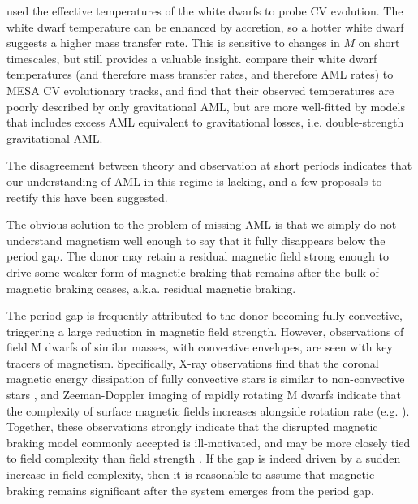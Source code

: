 \citet{Pala2017a} used the effective temperatures of the white dwarfs to probe CV evolution. The white dwarf temperature can be enhanced by accretion, so a hotter white dwarf suggests a higher mass transfer rate. This is sensitive to changes in $\dot M$ on short timescales, but still provides a valuable insight. \citet{Pala2017a} compare their white dwarf temperatures (and therefore mass transfer rates, and therefore AML rates) to MESA CV evolutionary tracks, and find that their observed temperatures are poorly described by only gravitational AML, but are more well-fitted by models that includes excess AML equivalent to gravitational losses, i.e. double-strength gravitational AML. 

The disagreement between theory and observation at short periods indicates that our understanding of AML in this regime is lacking, and a few proposals to rectify this have been suggested.

The obvious solution to the problem of missing AML is that we simply do not understand magnetism well enough to say that it fully disappears below the period gap. The donor may retain a residual magnetic field strong enough to drive some weaker form of magnetic braking that remains after the bulk of magnetic braking ceases, a.k.a. residual magnetic braking. 

The period gap is frequently attributed to the donor becoming fully convective, triggering a large reduction in magnetic field strength. However, observations of field M dwarfs of similar masses, with convective envelopes, are seen with key tracers of magnetism. Specifically, X-ray observations find that the coronal magnetic energy dissipation of fully convective stars is similar to non-convective stars \citep{wright2016}, and Zeeman-Doppler imaging of rapidly rotating M dwarfs indicate that the complexity of surface magnetic fields increases alongside rotation rate (e.g. \citealt{donati2003,donati2009,marsden2011,waite2011,waite2015}). 
Together, these observations strongly indicate that the disrupted magnetic braking model commonly accepted is ill-motivated, and may be more closely tied to field complexity than field strength \citep{garraffo2018}. If the gap is indeed driven by a sudden increase in field complexity, then it is reasonable to assume that magnetic braking remains significant after the system emerges from the period gap. 


